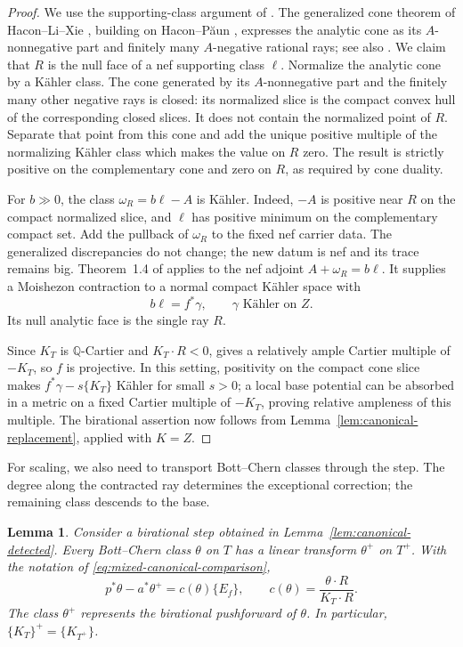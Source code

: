 \documentclass[11pt,a4paper]{article}
\numberwithin{equation}{section}
\newtheorem{lemma}[theorem]{Lemma}
\theoremstyle{definition}
\theoremstyle{remark}
\newcommand{\Q}{\mathbb Q}\newcommand{\R}{\mathbb R}
\begin{document}
\begin{proof}
We use the supporting-class argument of
\cite[proof of Lemma~3.6]{OAI034}.
The generalized cone theorem of Hacon--Li--Xie
\cite[Corollary~3.6]{HLX2026}, building on Hacon--P\u{a}un
\cite[Proposition~3.1 and Corollary~3.2]{HP2024}, expresses the
analytic cone as its $A$-nonnegative part and finitely many
$A$-negative rational rays; see also \cite[Theorem~1.3]{HX2026}.
We claim that $R$ is the null face of a nef supporting class
$\ell$. Normalize the analytic cone by a Kähler class. The cone generated by its $A$-nonnegative part and the
finitely many other negative rays is closed: its normalized slice
is the compact convex hull of the corresponding closed slices.
It does not contain the normalized point of $R$. Separate that
point from this cone and add the unique positive multiple of the
normalizing Kähler class which makes the value on $R$ zero. The
result is strictly positive on the complementary cone and zero on
$R$, as required by cone duality.

For $b\gg0$, the class $\omega_R=b\ell-A$ is Kähler. Indeed,
$-A$ is positive near $R$ on the compact normalized slice, and
$\ell$ has positive minimum on the complementary compact set.
Add the pullback of $\omega_R$ to the fixed nef carrier data.
The generalized discrepancies do not change; the new datum is nef
and its trace remains big. Theorem~1.4 of \cite{HX2026} applies
to the nef adjoint $A+\omega_R=b\ell$. It supplies a Moishezon
contraction to a normal compact Kähler space with
\[
 b\ell=f^*\gamma,\qquad\gamma\text{ Kähler on }Z.
\]
Its null analytic face is the single ray $R$.

Since $K_T$ is $\Q$-Cartier and $K_T\cdot R<0$,
\cite[Lemma~3.16]{OAI034} gives a relatively ample Cartier
multiple of $-K_T$, so $f$ is projective.
In this setting, positivity on the compact cone slice makes
$f^*\gamma-s\{K_T\}$ Kähler for small $s>0$; a local base
potential can be absorbed in a metric on a fixed Cartier multiple
of $-K_T$, proving relative ampleness of this multiple.
The birational assertion now follows from
Lemma~\ref{lem:canonical-replacement}, applied with $K=Z$.
\end{proof}

For scaling, we also need to transport Bott--Chern classes through
the step. The degree along the contracted ray determines the
exceptional correction; the remaining class descends to the base.

\begin{lemma}\label{lem:canonical-transport}
Consider a birational step obtained in
Lemma~\ref{lem:canonical-detected}. Every Bott--Chern class
$\theta$ on $T$ has a linear transform $\theta^+$ on $T^+$.
With the notation of \eqref{eq:mixed-canonical-comparison},
\begin{equation}\label{eq:canonical-linear-transport}
 p^*\theta-a^*\theta^+=c(\theta)\{E_f\},
 \qquad c(\theta)=\frac{\theta\cdot R}{K_T\cdot R}.
\end{equation}
The class $\theta^+$ represents the birational pushforward of
$\theta$. In particular, $\{K_T\}^+=\{K_{T^+}\}$.
\end{lemma}
\end{document}
